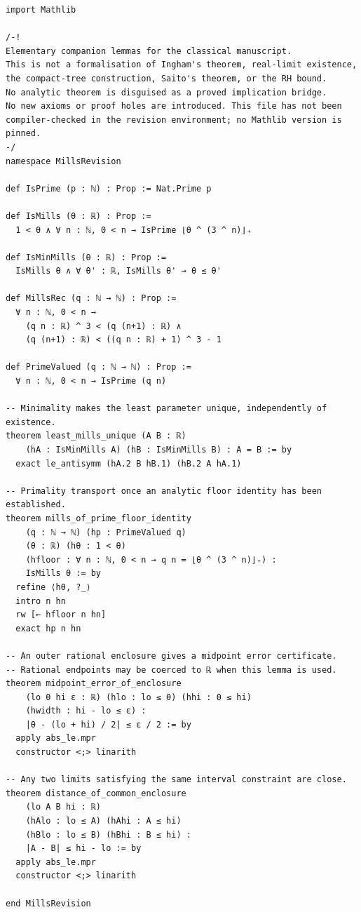 \documentclass[11pt,reqno]{amsart}
\theoremstyle{blueplain}
\numberwithin{equation}{section}
\begin{document}
\begin{lstlisting}[style=lean,basicstyle=\ttfamily\scriptsize,numberstyle=\scriptsize]
import Mathlib

/-!
Elementary companion lemmas for the classical manuscript.
This is not a formalisation of Ingham's theorem, real-limit existence,
the compact-tree construction, Saito's theorem, or the RH bound.
No analytic theorem is disguised as a proved implication bridge.
No new axioms or proof holes are introduced. This file has not been
compiler-checked in the revision environment; no Mathlib version is pinned.
-/
namespace MillsRevision

def IsPrime (p : ℕ) : Prop := Nat.Prime p

def IsMills (θ : ℝ) : Prop :=
  1 < θ ∧ ∀ n : ℕ, 0 < n → IsPrime ⌊θ ^ (3 ^ n)⌋₊

def IsMinMills (θ : ℝ) : Prop :=
  IsMills θ ∧ ∀ θ' : ℝ, IsMills θ' → θ ≤ θ'

def MillsRec (q : ℕ → ℕ) : Prop :=
  ∀ n : ℕ, 0 < n →
    (q n : ℝ) ^ 3 < (q (n+1) : ℝ) ∧
    (q (n+1) : ℝ) < ((q n : ℝ) + 1) ^ 3 - 1

def PrimeValued (q : ℕ → ℕ) : Prop :=
  ∀ n : ℕ, 0 < n → IsPrime (q n)

-- Minimality makes the least parameter unique, independently of existence.
theorem least_mills_unique (A B : ℝ)
    (hA : IsMinMills A) (hB : IsMinMills B) : A = B := by
  exact le_antisymm (hA.2 B hB.1) (hB.2 A hA.1)

-- Primality transport once an analytic floor identity has been established.
theorem mills_of_prime_floor_identity
    (q : ℕ → ℕ) (hp : PrimeValued q)
    (θ : ℝ) (hθ : 1 < θ)
    (hfloor : ∀ n : ℕ, 0 < n → q n = ⌊θ ^ (3 ^ n)⌋₊) :
    IsMills θ := by
  refine ⟨hθ, ?_⟩
  intro n hn
  rw [← hfloor n hn]
  exact hp n hn

-- An outer rational enclosure gives a midpoint error certificate.
-- Rational endpoints may be coerced to ℝ when this lemma is used.
theorem midpoint_error_of_enclosure
    (lo θ hi ε : ℝ) (hlo : lo ≤ θ) (hhi : θ ≤ hi)
    (hwidth : hi - lo ≤ ε) :
    |θ - (lo + hi) / 2| ≤ ε / 2 := by
  apply abs_le.mpr
  constructor <;> linarith

-- Any two limits satisfying the same interval constraint are close.
theorem distance_of_common_enclosure
    (lo A B hi : ℝ)
    (hAlo : lo ≤ A) (hAhi : A ≤ hi)
    (hBlo : lo ≤ B) (hBhi : B ≤ hi) :
    |A - B| ≤ hi - lo := by
  apply abs_le.mpr
  constructor <;> linarith

end MillsRevision
\end{lstlisting}
\end{document}
